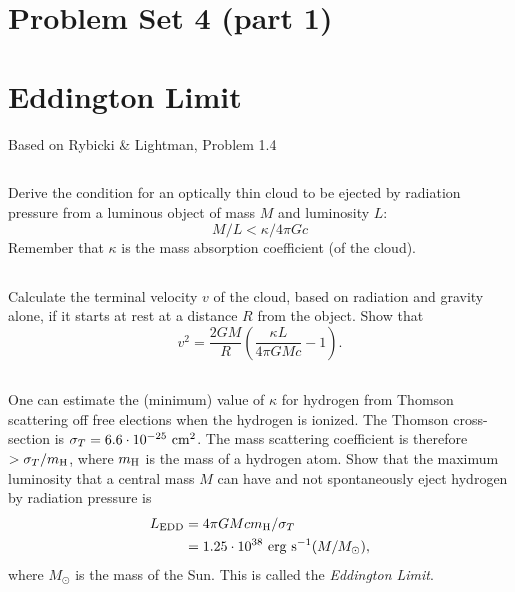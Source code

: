 \documentclass[11pt]{article}
\begin{document}
\pagestyle{empty}
\parindent=0pt

\section*{\centering Problem Set 4 (part 1)}

\section{Eddington Limit}

Based on Rybicki \& Lightman, Problem 1.4

\subsection{}
Derive the condition for an optically thin cloud to be ejected by radiation
pressure from a luminous object of mass $M$ and luminosity $L$:
\begin{equation}
M/L < \kappa/4\pi Gc
\end{equation}
Remember that $\kappa$ is the mass absorption coefficient (of the cloud).

\subsection{}
Calculate the terminal velocity $v$ of the cloud, based on radiation and
gravity alone, if it starts at rest at a distance $R$ from the object.  Show that
\begin{equation}
v^2=\frac{2GM}{R}\left(\frac{\kappa L}{4\pi GMc}-1\right).
\end{equation}

\subsection{}
One can estimate the (minimum) value of $\kappa$ for hydrogen from
Thomson scattering off free elections when the hydrogen is ionized.
The Thomson cross-section is $\sigma_T=6.6\cdot10^{-25}~{\rm cm}^2$.
The mass scattering coefficient is therefore $>\sigma_T/m_{\rm H}$,
where $m_{\rm H}$ is the mass of a hydrogen atom.  Show that the maximum
luminosity that a central mass $M$ can have and not spontaneously eject
hydrogen by radiation pressure is
\begin{align}
L_{\rm EDD}&=4\pi GMcm_{\rm H}/\sigma_T\\
&= 1.25\cdot10^{38}~{\rm erg}~{\rm s}^{-1} (M/M_\odot)\nonumber,
\end{align}
where $M_\odot$ is the mass of the Sun.  This is called the {\it Eddington Limit}.
\end{document}
